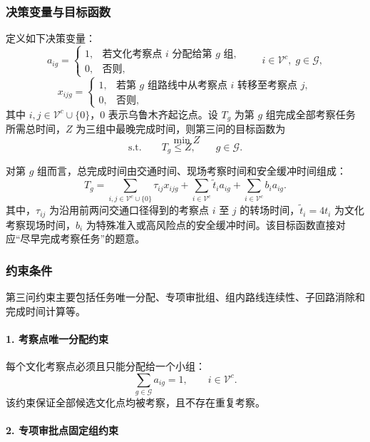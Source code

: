 \documentclass[UTF8,zihao=-4,a4paper]{ctexart}
\begin{document}
\subsubsection{决策变量与目标函数}
\label{subsubsec:q3_variables_objective}

定义如下决策变量：
\[
a_{ig}=
\begin{cases}
1, & \text{若文化考察点 } i \text{ 分配给第 } g \text{ 组},\\
0, & \text{否则},
\end{cases}
\qquad i\in\mathcal{V}^{c},\;g\in\mathcal{G},
\]
\[
x_{ijg}=
\begin{cases}
1, & \text{若第 } g \text{ 组路线中从考察点 } i \text{ 转移至考察点 } j,\\
0, & \text{否则},
\end{cases}
\]
其中 $i,j\in \mathcal{V}^{c}\cup\{0\}$，$0$ 表示乌鲁木齐起讫点。设 $T_g$ 为第 $g$ 组完成全部考察任务所需总时间，$Z$ 为三组中最晚完成时间，则第三问的目标函数为
\[
\min Z
\]
\[
\text{s.t.}\qquad T_g\leq Z,\qquad g\in\mathcal{G}.
\]

对第 $g$ 组而言，总完成时间由交通时间、现场考察时间和安全缓冲时间组成：
\[
T_g
=
\sum_{i,j\in\mathcal{V}^{c}\cup\{0\}}
\tau_{ij}x_{ijg}
+
\sum_{i\in\mathcal{V}^{c}}
\tilde{t}_i a_{ig}
+
\sum_{i\in\mathcal{V}^{c}}
b_i a_{ig}.
\]
其中，$\tau_{ij}$ 为沿用前两问交通口径得到的考察点 $i$ 至 $j$ 的转场时间，$\tilde{t}_i=4t_i$ 为文化考察现场时间，$b_i$ 为特殊准入或高风险点的安全缓冲时间。该目标函数直接对应“尽早完成考察任务”的题意。

\subsubsection{约束条件}
\label{subsubsec:q3_constraints}

第三问约束主要包括任务唯一分配、专项审批组、组内路线连续性、子回路消除和完成时间计算等。

\paragraph{1. 考察点唯一分配约束}

每个文化考察点必须且只能分配给一个小组：
\[
\sum_{g\in\mathcal{G}}a_{ig}=1,
\qquad i\in\mathcal{V}^{c}.
\]
该约束保证全部候选文化点均被考察，且不存在重复考察。

\paragraph{2. 专项审批点固定组约束}
\end{document}
